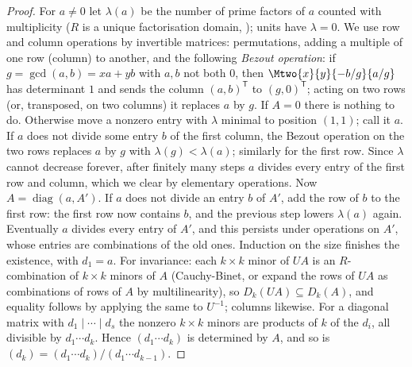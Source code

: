 \begin{proof}
For $a\ne0$ let $\lambda(a)$ be the number of prime factors of $a$ counted with multiplicity ($R$ is a unique factorisation domain,
); units have $\lambda=0$. We use row and column operations by invertible matrices: permutations, adding a
multiple of one row (column) to another, and the following \emph{Bezout operation}: if $g=\gcd(a,b)=xa+yb$ with $a,b$ not both $0$,
then $\Mtwo{x}{y}{-b/g}{a/g}$ has determinant $1$ and sends the column $(a,b)^{\mathsf T}$ to $(g,0)^{\mathsf T}$; acting on two rows (or, transposed, on
two columns) it replaces $a$ by $g$.
If $A=0$ there is nothing to do. Otherwise move a nonzero entry with $\lambda$ minimal to position $(1,1)$; call it $a$. If $a$
does not divide some entry $b$ of the first column, the Bezout operation on the two rows replaces $a$ by $g$ with $\lambda(g)<\lambda(a)$;
similarly for the first row. Since $\lambda$ cannot decrease forever, after finitely many steps $a$ divides every entry of the first row
and column, which we clear by elementary operations. Now $A=\operatorname{diag}(a,A')$. If $a$ does not divide an entry $b$ of $A'$, add the row of
$b$ to the first row: the first row now contains $b$, and the previous step lowers $\lambda(a)$ again. Eventually $a$ divides every
entry of $A'$, and this persists under operations on $A'$, whose entries are combinations of the old ones. Induction on the size
finishes the existence, with $d_1=a$.
For invariance: each $k\times k$ minor of $UA$ is an $R$-combination of $k\times k$ minors of $A$ (Cauchy-Binet, or expand the rows of $UA$ as
combinations of rows of $A$ by multilinearity), so $D_k(UA)\subseteq D_k(A)$, and equality follows by applying the same to $U^{-1}$; columns
likewise. For a diagonal matrix with $d_1\mid\cdots\mid d_s$ the nonzero $k\times k$ minors are products of $k$ of the $d_i$, all divisible by
$d_1\cdots d_k$. Hence $(d_1\cdots d_k)$ is determined by $A$, and so is $(d_k)=(d_1\cdots d_k)/(d_1\cdots d_{k-1})$.
\end{proof}

